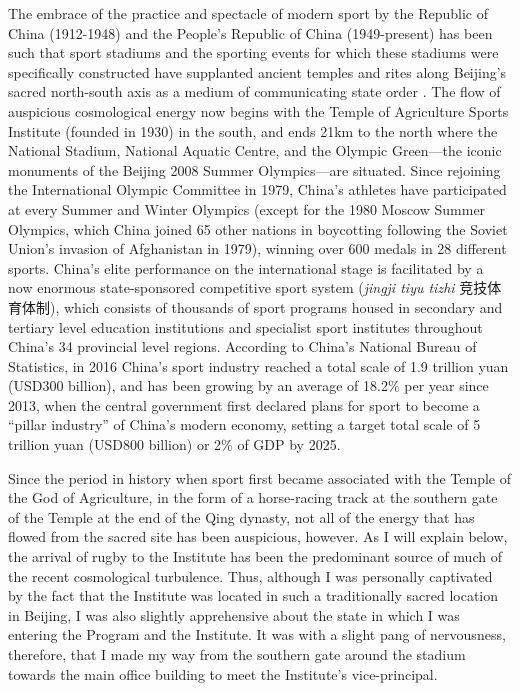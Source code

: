 The embrace of the practice and spectacle of modern sport by the Republic of China (1912-1948) and the People's Republic of China (1949-present) has been such that
sport stadiums and the sporting events for which these stadiums were specifically constructed have supplanted ancient temples and rites along Beijing's sacred north-south axis as a medium of communicating state order \citep{Brownell1995}.  The flow of auspicious cosmological energy now begins with the Temple of Agriculture Sports Institute (founded in 1930) in the south, and ends 21km to the north where the National Stadium, National Aquatic Centre, and the Olympic Green---the iconic monuments of the Beijing 2008 Summer Olympics---are situated.  Since rejoining the International Olympic Committee in 1979, China's athletes have participated at every Summer and Winter Olympics (except for the 1980 Moscow Summer Olympics, which China joined 65 other nations in boycotting following the Soviet Union's invasion of Afghanistan in 1979), winning over 600 medals in 28 different sports.  China's elite performance on the international stage is facilitated by a now enormous state-sponsored competitive sport system (\textit{jingji tiyu tizhi} 竞技体育体制), which consists of thousands of sport programs housed in secondary and tertiary level education institutions and specialist sport institutes throughout China's 34 provincial level regions.  According to China's National Bureau of Statistics, in 2016 China's sport industry reached a total scale of 1.9 trillion yuan (USD300 billion), and has been growing by an average of 18.2\% per year since 2013, when the central government first declared plans for sport to become a ``pillar industry'' of China's modern economy, setting a target total scale of 5 trillion yuan (USD800 billion) or 2\% of GDP by 2025.

Since the period in history when sport first became associated with the Temple of the God of Agriculture, in the form of a horse-racing track at the southern gate of the Temple at the end of the Qing dynasty, not all of the energy that has flowed from the sacred site has been auspicious, however.  As I will explain below, the arrival of rugby to the Institute has been the predominant source of much of the recent cosmological turbulence.  Thus, although I was personally captivated by the fact that the Institute was located in such a traditionally sacred location in Beijing, I was also slightly apprehensive about the state in which I was entering the Program and the Institute. It was with a slight pang of nervousness, therefore, that I made my way from the southern gate around the stadium towards the main office building to meet the Institute's vice-principal.

